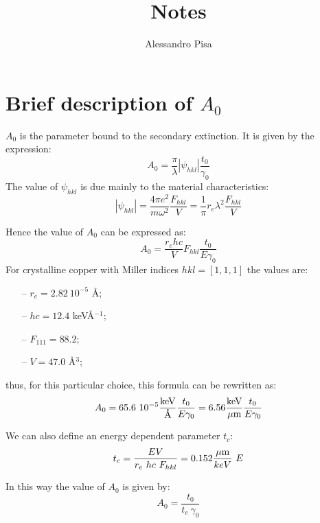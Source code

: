 \documentclass[12pt,a4paper]{article}
\title{Notes}
\author{Alessandro Pisa}
\begin{document}
\section{Brief description of $A_0$}
$A_0$ is the parameter bound to the secondary extinction. It is given by the expression:
\begin{equation}
A_0 = \frac \pi \lambda |{\psi _{hkl}}| \frac {t_0}{\gamma_0}
\end{equation} 
The value of $\psi _{hkl}$ is due mainly to the material characteristics:
\begin{equation}
|\psi _{hkl}| 	= \frac {4\pi  e^2}{m\omega^2} \frac{F_{hkl}}V
= \frac 1\pi r_e \lambda^2 \frac{F_{hkl}}V
\end{equation}

Hence the value of $A_0$ can be expressed as:
\begin{equation}
A_0 = \frac{r_ehc}{V}F_{hkl} \frac{t_0}{E\gamma_0}
\end{equation} 
For crystalline copper with Miller indices $hkl=[1,1,1]$ the values are:
\begin{itemize}
\item[--] $r_e=2.82~10^{-5}$ \AA;
\item[--] $hc=12.4$ keV\AA$^{-1}$;
\item[--] $F_{111}=88.2$;
\item[--] $V=47.0$ \AA$^3$;
\end{itemize}
thus, for this particular choice, this formula can be rewritten as:
\begin{equation}
A_0 = 65.6~10^{-5}\frac{\text{keV}}{\text{\AA}} \frac{t_0}{E\gamma_0}=
6.56\frac{\text{keV}}{\mu\text m} \frac{t_0}{E\gamma_0}
\end{equation} 

We can also define an energy dependent parameter $t_c$:
\begin{equation}
t_c=\frac{EV}{r_e~hc~F_{hkl}}=0.152 \frac{\mu \text m}{keV}~E
\end{equation}

In this way the value of $A_0$ is given by:
\begin{equation}
A_0 = \frac{t_0}{t_c~\gamma_0}
\end{equation}
\end{document}
